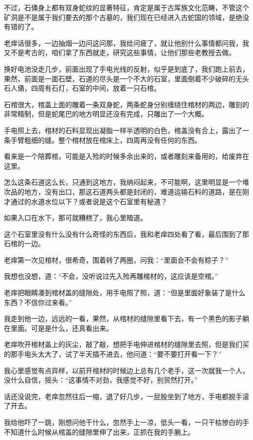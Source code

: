 不过，石俑身上都有双身蛇纹的显著特征，肯定是属于古厍族文化范畴，不管这个矿洞是不是属于我们要去的那个古墓的，我们现在已经进入古蛇国的领域，是绝没有错的了。

老痒话很多，一边抽烟一边问这问那，我给问疲了，就让他别什么事情都问我，我又不是考古的，咱们拿了东西就走，研究这些事情，让他们那些老教授去做。

换好电池没走几步，前面出现了手电光线的反射，似乎是到底了，我们跑上前去，果然，前面是一面石壁，石道的尽头是一个不大的石室，里面倒着不少破碎的无头石人俑，四周有石灯，石室的中间，放着一只石棺。

石棺很大，棺盖上面的雕着一条双身蛇，两条蛇身分别缠绕住棺材的两边，雕刻的非常精制，但是蛇尾巴的地方明显还没有完成，只雕出了一个大概。

手电照上去，棺材的石料显现出凝脂一样半透明的白色，棺盖没有合上，露出了一条手臂粗细的缝。整个棺材放在棺床上，四周再没有任何的东西。

看来是一个陪葬棺，可能是入殓的时候多余出来的，或者雕刻来备用的，给废弃在这里。

怎么这条石道这么长，只通到这地方，我纳闷起来，不可能啊，这里明显是一个堆次品的地方，没有出口，那这石道两头都是封闭的，难道运输石料的道路，是在刚才通过的水道水位以下？或者说是这个石室里有秘道？

如果入口在水下，那可就糟糕了，我心里暗道。

这个石室里没有什么没有什么奇怪的东西后，我和老痒四处看了看，最后围到了那石棺的一边。

老痒第一次见棺材，很希奇，围着转了两圈，问我：“里面会不会有粽子？”

我想也没想，道：“不会，没听说过先入殓再雕棺材的，这应该是空棺。”

老痒把眼睛凑到棺材盖的缝隙处，用手电照了照，道：“但是里面好象装了是什么东西？不信你过来看。”

我走到他一边，远远的一看，果然，从棺材的缝隙里看下去，有一个黑色的影子躺在里面。可是是什么，还真看出来。

老痒吹开棺材盖上的灰尘，敲了敲，想把手电伸进棺材的缝隙里去照，但是我们买的那手电头太大了，试了半天插不进去，他问道：“要不要打开看一下？”

我心里感觉有点异样，以前开棺材的时候边上总有几个老手，这一次就我一个人，没什么自信，摇头：“这事情不对劲，我感觉不好，别贸然打开。”

话还没说完，老痒忽然往后一缩，退了好几步，一屁股坐到了地方，手电都脱手滚了开去。

我给他吓了一跳，刚想问他干什么，忽然手上一凉，低头一看，一只干枯惨白的手不知道什么时候从棺盖的缝隙里伸了出来，正抓在我的手腕上。

